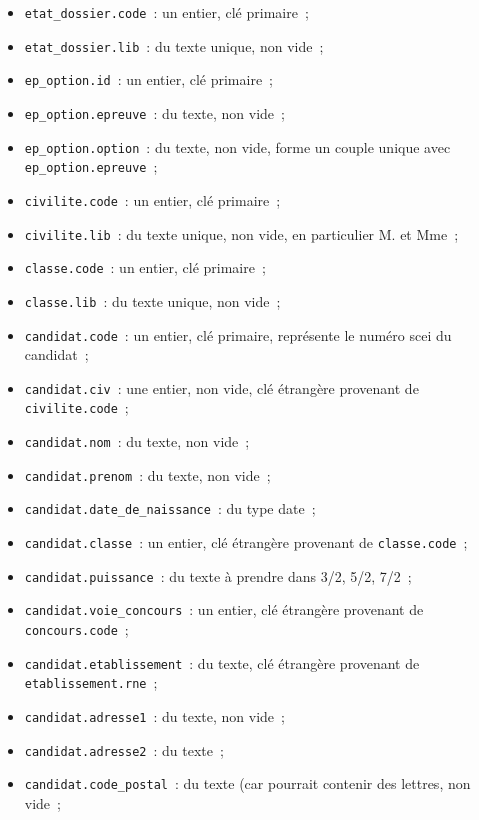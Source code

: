 \documentclass[12pt]{article}
\begin{document}
\begin{itemize}[label=\textbullet]
            \item \texttt{etat\_dossier.code}~: un entier, clé primaire~;
            \item \texttt{etat\_dossier.lib}~: du texte unique, non vide~;
            \item \texttt{ep\_option.id}~: un entier, clé primaire~;
            \item \texttt{ep\_option.epreuve}~: du texte, non vide~;
            \item \texttt{ep\_option.option}~: du texte, non vide, forme un couple unique avec \texttt{ep\_option.epreuve}~;
            \item \texttt{civilite.code}~: un entier, clé primaire~;
            \item \texttt{civilite.lib}~: du texte unique, non vide, en particulier M. et Mme~;
            \item \texttt{classe.code}~: un entier, clé primaire~;
            \item \texttt{classe.lib}~: du texte unique, non vide~;
            \item \texttt{candidat.code}~: un entier, clé primaire, représente le numéro scei du candidat~;
            \item \texttt{candidat.civ}~: une entier, non vide, clé étrangère provenant de \texttt{civilite.code}~;
            \item \texttt{candidat.nom}~: du texte, non vide~;
            \item \texttt{candidat.prenom}~: du texte, non vide~;
            \item \texttt{candidat.date\_de\_naissance}~: du type date~;
            \item \texttt{candidat.classe}~: un entier, clé étrangère provenant de \texttt{classe.code}~;
            \item \texttt{candidat.puissance}~: du texte à prendre dans 3/2, 5/2, 7/2~;
            \item \texttt{candidat.voie\_concours}~: un entier, clé étrangère provenant de \texttt{concours.code}~;
            \item \texttt{candidat.etablissement}~: du texte, clé étrangère provenant de \texttt{etablissement.rne}~;
            \item \texttt{candidat.adresse1}~: du texte, non vide~;
            \item \texttt{candidat.adresse2}~: du texte~;
            \item \texttt{candidat.code\_postal}~: du texte (car pourrait contenir des lettres, non vide~;

\end{itemize}
\end{document}
